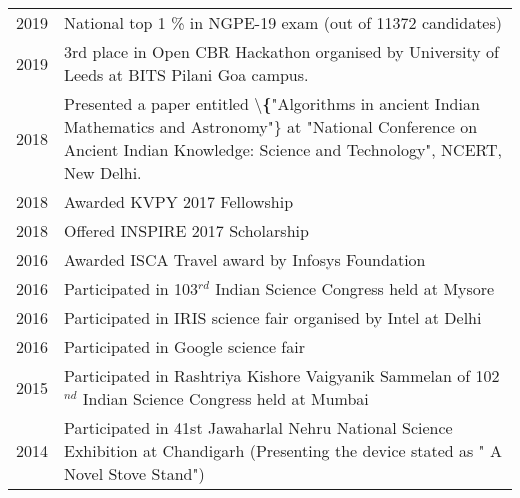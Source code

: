\documentclass[]{deedy-resume-openfont}
\begin{document}
\begin{minipage}[t]{0.66\textwidth}
\begin{tabular}{p{1cm}|p{11cm}}
2019 & National top 1 \% in NGPE-19 exam (out of 11372 candidates)                                                                                                                                                    \\
2019 & 3rd place in Open CBR Hackathon organised by University of Leeds at BITS Pilani Goa campus.                                                                                                                    \\
2018 & Presented a paper entitled \textbackslash{}\textbf\{"Algorithms in ancient Indian Mathematics and Astronomy"\}  at "National Conference on Ancient Indian Knowledge: Science and Technology", NCERT, New Delhi. \\
2018 & Awarded KVPY 2017 Fellowship                                                                                                                                                                                   \\
2018 & Offered INSPIRE 2017 Scholarship                                                                                                                                                                               \\
2016 & Awarded ISCA Travel award by Infosys Foundation                                                                                                                                                                \\
2016 & Participated in 103$^{rd}$ Indian Science Congress held at Mysore                                                                                                                                              \\
2016 & Participated in IRIS science fair organised by Intel at Delhi                                                                                                                                                  \\
2016 & Participated in Google science fair                                                                                                                                                                            \\
2015 & Participated in Rashtriya Kishore Vaigyanik Sammelan of 102$^{nd}$ Indian Science Congress held at Mumbai     \\                             2014 & Participated in 41st Jawaharlal Nehru National Science Exhibition at Chandigarh (Presenting the device  stated as " A Novel Stove Stand")                                                         
\end{tabular}


\end{minipage}
\end{document}
